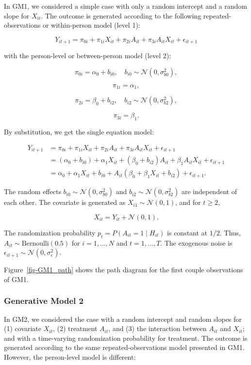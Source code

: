 \documentclass[
  12pt,
  a4paper,
]{article}
\begin{document}
In GM1, we considered a simple case with only a random intercept and a
random slope for \(X_{it}\). The outcome is generated according to the
following repeated-observations or within-person model (level 1):

\[
Y_{it+1} = \pi_{0i} + \pi_{1i} X_{it} + \pi_{2i} A_{it} + \pi_{3i} A_{it} X_{it} + \epsilon_{it+1}
\]

with the person-level or between-person model (level 2):

\[
\pi_{0i} = \alpha_0 + b_{i0}, \quad b_{i0} \sim \mathcal{N}(0, \sigma_{b0}^2),
\]

\[
\pi_{1i} = \alpha_1,
\]

\[
\pi_{2i} = \beta_0 + b_{i2}, \quad b_{i2} \sim \mathcal{N}(0, \sigma_{b2}^2),
\]

\[
\pi_{3i} = \beta_1.
\]

By substitution, we get the single equation model:

\[
\begin{aligned}
Y_{it+1} &= \pi_{0i} + \pi_{1i} X_{it} + \pi_{2i} A_{it} + \pi_{3i} A_{it} X_{it} + \epsilon_{it+1} \\
&= (\alpha_0 + b_{i0}) + \alpha_1 X_{it} + (\beta_0 + b_{i2}) A_{it} + \beta_1 A_{it} X_{it} + \epsilon_{it+1} \\
&= \alpha_0 + \alpha_1 X_{it} + b_{i0} + A_{it} (\beta_0 + \beta_1 X_{it} + b_{i2}) + \epsilon_{it+1}.
\end{aligned}
\]

The random effects \(b_{i0} \sim \mathcal{N}(0, \sigma_{b0}^2)\) and
\(b_{i2} \sim \mathcal{N}(0, \sigma_{b2}^2)\) are independent of each
other. The covariate is generated as \(X_{i1} \sim \mathcal{N}(0, 1)\),
and for \(t \geq 2\),

\[
X_{it} = Y_{it} + \mathcal{N}(0, 1).
\]

The randomization probability \(p_t = P(A_{it} = 1 \mid H_{it})\) is
constant at \(1/2\). Thus, \(A_{it} \sim \text{Bernoulli}(0.5)\) for
\(i = 1, \ldots, N\) and \(t = 1, \ldots, T\). The exogenous noise is
\(\epsilon_{it+1} \sim \mathcal{N}(0, \sigma_\epsilon^2)\).

Figure~\ref{fig-GM1_path} shows the path diagram for the first couple
observations of GM1.

\subsubsection{Generative Model 2}\label{generative-model-2}

In GM2, we considered the case with a random intercept and random slopes
for (1) covariate \(X_{it}\), (2) treatment \(A_{it}\), and (3) the
interaction between \(A_{it}\) and \(X_{it}\); and with a time-varying
randomization probability for treatment. The outcome is generated
according to the same repeated-observations model presented in GM1.
However, the person-level model is different:
\end{document}
